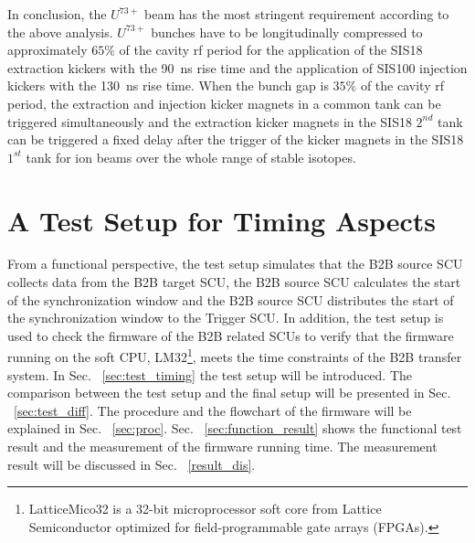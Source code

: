 In conclusion, the $U^\mathit{73+}$ beam has the most stringent requirement according to the above analysis. $U^\mathit{73+}$ bunches have to be longitudinally compressed to approximately $65\%$ of the cavity rf period for the application of the SIS18 extraction kickers with the \SI{90}{ns} rise time and the application of SIS100 injection kickers with the \SI{130}{ns} rise time. When the bunch gap is $35\%$ of the cavity rf period, the extraction and injection kicker magnets in a common tank can be triggered simultaneously and the extraction kicker magnets in the SIS18 $2^{nd}$ tank can be triggered a fixed delay after the trigger of the kicker magnets in the SIS18  $1^{st}$ tank for ion beams over the whole range of stable isotopes.
\section{A Test Setup for Timing Aspects}
\label{real_test}

From a functional perspective, the test setup simulates that the B2B source SCU collects data from the B2B target SCU, the B2B source SCU calculates the start of the synchronization window and the B2B source SCU distributes the start of the synchronization window to the Trigger SCU. In addition, the test setup is used to check the firmware of the B2B related SCUs to verify that the firmware running on the soft CPU, LM32\footnote{LatticeMico32 is a 32-bit microprocessor soft core from Lattice Semiconductor optimized for field-programmable gate arrays (\gls{FPGA}s).}, meets the time constraints of the B2B transfer system.  In Sec. ~\ref{sec:test_timing} the test setup will be introduced. The comparison between the test setup and the final setup will be presented in Sec. ~\ref{sec:test_diff}. The procedure and the flowchart of the firmware will be explained in Sec. ~\ref{sec:proc}. Sec. ~\ref{sec:function_result} shows the functional test result and the measurement of the firmware running time. The measurement result will be discussed in Sec. ~\ref{result_dis}.  

